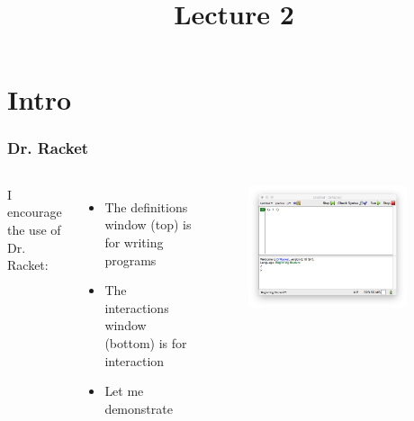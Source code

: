 \documentclass{beamer}
\title{Lecture 2}
\begin{document}
\begin{frame}
\titlepage
\end{frame}

\section{Intro}

\begin{frame}
  \frametitle{Dr. Racket}
  \begin{columns}
    I encourage the use of Dr. Racket:
    \begin{itemize}
    \item<1-> The definitions window (top) is for writing programs
    \item<2-> The interactions window (bottom) is for interaction
    \item<3-> Let me demonstrate 
    \end{itemize}
    \begin{figure}
      \centering \includegraphics[width=0.9\textwidth]{images/drracket-plain.png}
    \end{figure}
  \end{columns}
\end{frame}
\end{document}
